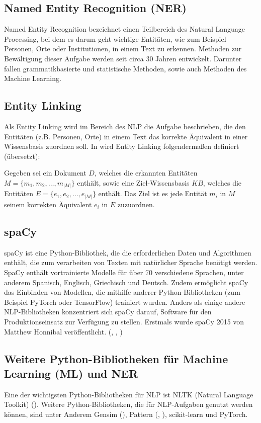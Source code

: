 \subsection{Named Entity Recognition (NER)}
Named Entity Recognition bezeichnet einen Teilbereich des Natural Language Processing, bei dem es darum geht 
wichtige Entitäten, wie zum Beispiel Personen, Orte oder Institutionen, in einem Text zu erkennen. Methoden 
zur Bewältigung dieser Aufgabe werden seit circa 30 Jahren entwickelt. Darunter fallen grammatikbasierte und 
statistische Methoden, sowie auch Methoden des Machine Learning.

\subsection{Entity Linking}
Als Entity Linking wird im Bereich des NLP die Aufgabe beschrieben, die den Entitäten (z.B. Personen, Orte) 
in einem Text das korrekte Äquivalent in einer Wissensbasis zuordnen soll.
In \cite{shen_entity_2021} wird Entity Linking folgendermaßen definiert (übersetzt):
\begin{defn}
Gegeben sei ein Dokument $D$, welches die erkannten Entitäten $M=\{m_1, m_2, \dots, m_{|M|}\}$ enthält, sowie
eine Ziel-Wissensbasis $KB$, welches die Entitäten $E=\{e_1, e_2, \dots, e_{|M|}\}$ enthält. Das Ziel ist es 
jede Entität $m_i$ in $M$ seinem korrekten Äquivalent $e_i$ in $E$ zuzuordnen.
\end{defn}

\subsection{spaCy}
spaCy ist eine Python-Bibliothek, die die erforderlichen Daten und Algorithmen enthält, die zum verarbeiten von
Texten mit natürlicher Sprache benötigt werden. SpaCy enthält vortrainierte Modelle für über 70 verschiedene 
Sprachen, unter anderem Spanisch, Englisch, Griechisch und Deutsch. Zudem ermöglicht spaCy das Einbinden von 
Modellen, die mithilfe anderer Python-Bibliotheken (zum Beispiel PyTorch oder TensorFlow) trainiert wurden.
Anders als einige andere NLP-Bibliotheken konzentriert sich spaCy darauf, Software für den Produktionseinsatz 
zur Verfügung zu stellen. Erstmals wurde spaCy 2015 von Matthew Honnibal veröffentlicht. 
(\cite{vasiliev2020natural}, \cite{github_spacy}, \cite{spacy})

\subsection{Weitere Python-Bibliotheken für Machine Learning (ML) und NER}
Eine der wichtigsten Python-Bibliotheken für NLP ist NLTK (Natural Language Toolkit) (\cite{bird2006nltk}).
Weitere Python-Bibliotheken, die für NLP-Aufgaben genutzt werden können, sind unter Anderem
Gensim (\cite{vrehuuvrek2011gensim}), Pattern (\cite{de2012pattern}, \cite{github_pattern}), 
scikit-learn und PyTorch.

